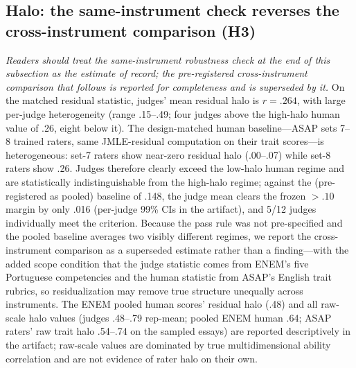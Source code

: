 \documentclass[fleqn,10pt]{JLA_article}
\begin{document}
\subsection{Halo: the same-instrument check reverses the cross-instrument comparison (H3)}
\label{sec:halo}
\emph{Readers should treat the same-instrument robustness check at the end of this subsection as the estimate of record; the pre-registered cross-instrument comparison that follows is reported for completeness and is superseded by it.} On the matched residual statistic, judges' mean residual halo is $r = .264$, with large per-judge heterogeneity (range .15--.49; four judges above the high-halo human value of .26, eight below it). The design-matched human baseline---ASAP sets 7--8 trained raters, same JMLE-residual
computation on their trait scores---is heterogeneous: set-7 raters show near-zero residual halo
(.00--.07) while set-8 raters show .26. Judges therefore clearly exceed the low-halo human regime
and are statistically indistinguishable from the high-halo regime; against the (pre-registered as
pooled) baseline of .148, the judge mean clears the frozen $>.10$ margin by only .016 (per-judge 99\% CIs in the artifact), and 5/12 judges individually meet the criterion. Because the pass rule was not pre-specified and the pooled baseline averages two visibly different regimes, we report the cross-instrument comparison as a superseded estimate rather than a finding---with the added scope condition that the judge statistic comes from ENEM's five Portuguese competencies and the human statistic from ASAP's English trait rubrics, so residualization may remove true structure unequally across instruments. The ENEM pooled human scores' residual halo (.48) and all raw-scale halo values (judges .48--.79 rep-mean; pooled ENEM human .64; ASAP raters' raw trait halo .54--.74 on the sampled essays) are reported descriptively in the artifact; raw-scale values are dominated by true multidimensional ability correlation and are not evidence of rater halo on their own.
\end{document}
